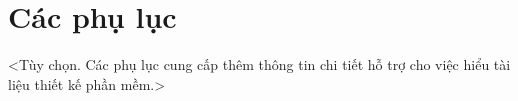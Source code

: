 
\clearpage

\section{Các phụ lục}

<Tùy chọn. Các phụ lục cung cấp thêm thông tin chi tiết hỗ trợ cho việc hiểu tài liệu thiết kế phần 
mềm.>